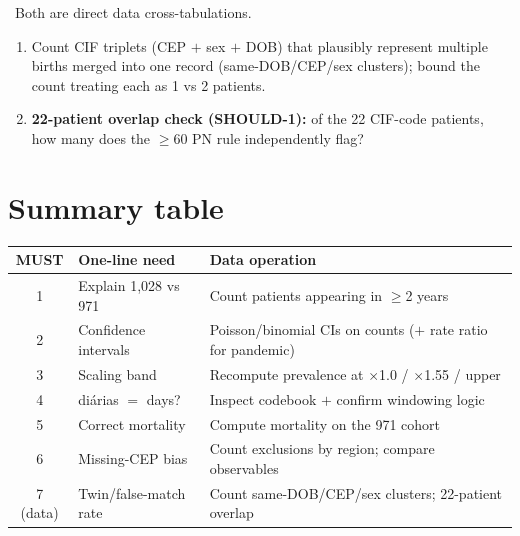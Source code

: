 \documentclass[11pt,a4paper]{article}
\begin{document}
\whyHead\ Both are direct data cross-tabulations.

\opHead
\begin{enumerate}[leftmargin=*, topsep=2pt]
  \item Count CIF triplets (CEP $+$ sex $+$ DOB) that plausibly represent multiple births
        merged into one record (same-DOB/CEP/sex clusters); bound the count treating each as
        1 vs 2 patients.
  \item \textbf{22-patient overlap check (SHOULD-1):} of the 22 CIF-code patients, how many
        does the $\geq$60 PN rule independently flag?
\end{enumerate}

\section*{Summary table}

\begin{longtable}{@{}c p{4.3cm} p{6.6cm}@{}}
\toprule
\textbf{MUST} & \textbf{One-line need} & \textbf{Data operation} \\
\midrule
\endhead
1 & Explain 1,028 vs 971 & Count patients appearing in $\geq$2 years \\
2 & Confidence intervals & Poisson/binomial CIs on counts ($+$ rate ratio for pandemic) \\
3 & Scaling band & Recompute prevalence at $\times$1.0 / $\times$1.55 / upper \\
4 & di\'{a}rias $=$ days? & Inspect codebook $+$ confirm windowing logic \\
5 & Correct mortality & Compute mortality on the 971 cohort \\
6 & Missing-CEP bias & Count exclusions by region; compare observables \\
7 (data) & Twin/false-match rate & Count same-DOB/CEP/sex clusters; 22-patient overlap \\
\bottomrule
\end{longtable}
\end{document}
